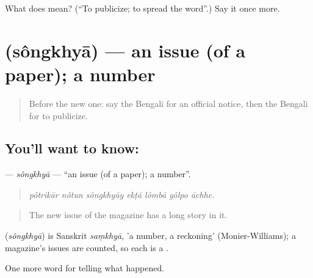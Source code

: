 \begin{tcolorbox}[breakable,colback=teal!4,colframe=teal!35!black,title={Before you move on}]
What does   mean? (\textquotedblleft{}To publicize; to spread the word\textquotedblright{}.) Say it once more.
\end{tcolorbox}
\section[\texorpdfstring{\bn{সংখ্যা} (sôngkhyā)}{সংখ্যা (sôngkhyā)}]{ (sôngkhyā) — an issue (of a paper); a number}

\label{lesson:BN-C300-songkhya}



\begin{quote}
Before the new one: say the Bengali for an official notice, then the Bengali for to publicize.
\end{quote}

\subsection*{You'll want to know: }
\textbf{} — \emph{sôngkhyā} — \textquotedblleft{}an issue (of a paper); a number\textquotedblright{}.

\begin{quote}
      
\end{quote}

\begin{quote}
\emph{pôtrikār nôtun sôngkhyāy ekṭā lômbā gôlpo āchhe.}
\end{quote}

\begin{quote}
The new issue of the magazine has a long story in it.
\end{quote}

\begin{cousinweb}
\textbf{} (\emph{sôngkhyā}) is Sanskrit \emph{saṃkhyā}, 'a number, a reckoning' (Monier-Williams); a magazine's issues are counted, so each is a .
\end{cousinweb}

\begin{grammarlens}[title={What you've built}]
One more word for telling what happened.
\end{grammarlens}

